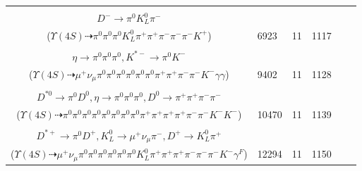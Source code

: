 \documentclass[landscape]{article}
\newcounter{rownumbers}
\newcommand\rn{\stepcounter{rownumbers}\arabic{rownumbers}}
\newcommand{\EOLP}{\\ \hline} %
\newcommand{\topoTags}[1]{#1} %
\begin{document}
\begin{longtable}{clcccc}
\rn & \makecell[l]{ $ 
\Upsilon(4S) \rightarrow B^{0} B^{0} ,
B^{0} \rightarrow K^{+} a_{1}^{-} ,
B^{0} \rightarrow \pi^{0} \pi^{+} D^{*-} ,
a_{1}^{-} \rightarrow \pi^{-} f_{0}(600) ,
D^{*-} \rightarrow \pi^{0} D^{-} ,
f_{0}(600) \rightarrow \pi^{+} \pi^{-} ,
$ \\ $
D^{-} \rightarrow \pi^{0} K_{L}^{0} \pi^{-} 
$ \\ ($
\Upsilon(4S) \dashrightarrow \pi^{0} \pi^{0} \pi^{0} K_{L}^{0} \pi^{+} \pi^{+} \pi^{-} \pi^{-} \pi^{-} K^{+} 
$) } & \topoTags{6923 & }11 & 1117 \EOLP

\rn & \makecell[l]{ $ 
\Upsilon(4S) \rightarrow B^{0} \bar{B}^{0} ,
B^{0} \rightarrow \mu^{+} \nu_{\mu} \eta D^{-} ,
\bar{B}^{0} \rightarrow \pi^{+} K^{*}(1410)^{-} ,
\eta \rightarrow \gamma \gamma ,
D^{-} \rightarrow \pi^{0} \pi^{+} \pi^{-} \pi^{-} \eta ,
K^{*}(1410)^{-} \rightarrow \pi^{0} K^{*-} ,
$ \\ $
\eta \rightarrow \pi^{0} \pi^{0} \pi^{0} ,
K^{*-} \rightarrow \pi^{0} K^{-} 
$ \\ ($
\Upsilon(4S) \dashrightarrow \mu^{+} \nu_{\mu} \pi^{0} \pi^{0} \pi^{0} \pi^{0} \pi^{0} \pi^{0} \pi^{+} \pi^{+} \pi^{-} \pi^{-} K^{-} \gamma \gamma 
$) } & \topoTags{9402 & }11 & 1128 \EOLP

\rn & \makecell[l]{ $ 
\Upsilon(4S) \rightarrow \bar{B}^{0} \bar{B}^{0} ,
\bar{B}^{0} \rightarrow \rho^{+} K^{-} ,
\bar{B}^{0} \rightarrow \pi^{0} \bar{K}^{*} \eta^{\prime} D^{*0} ,
\rho^{+} \rightarrow \pi^{0} \pi^{+} ,
\bar{K}^{*} \rightarrow \pi^{+} K^{-} ,
\eta^{\prime} \rightarrow \pi^{0} \pi^{0} \eta ,
$ \\ $
D^{*0} \rightarrow \pi^{0} D^{0} ,
\eta \rightarrow \pi^{0} \pi^{0} \pi^{0} ,
D^{0} \rightarrow \pi^{+} \pi^{+} \pi^{-} \pi^{-} 
$ \\ ($
\Upsilon(4S) \dashrightarrow \pi^{0} \pi^{0} \pi^{0} \pi^{0} \pi^{0} \pi^{0} \pi^{0} \pi^{0} \pi^{+} \pi^{+} \pi^{+} \pi^{+} \pi^{-} \pi^{-} K^{-} K^{-} 
$) } & \topoTags{10470 & }11 & 1139 \EOLP

\rn & \makecell[l]{ $ 
\Upsilon(4S) \rightarrow B^{0} \bar{B}^{0} ,
B^{0} \rightarrow \pi^{+} D^{-} ,
\bar{B}^{0} \rightarrow \pi^{0} \pi^{+} \pi^{-} \rho^{-} \eta D^{*+} \gamma^{F} ,
D^{-} \rightarrow K_{L}^{0} K^{-} ,
\rho^{-} \rightarrow \pi^{0} \pi^{-} ,
\eta \rightarrow \pi^{0} \pi^{0} \pi^{0} ,
$ \\ $
D^{*+} \rightarrow \pi^{0} D^{+} ,
K_{L}^{0} \rightarrow \mu^{+} \nu_{\mu} \pi^{-} ,
D^{+} \rightarrow K_{L}^{0} \pi^{+} 
$ \\ ($
\Upsilon(4S) \dashrightarrow \mu^{+} \nu_{\mu} \pi^{0} \pi^{0} \pi^{0} \pi^{0} \pi^{0} \pi^{0} K_{L}^{0} \pi^{+} \pi^{+} \pi^{+} \pi^{-} \pi^{-} \pi^{-} K^{-} \gamma^{F} 
$) } & \topoTags{12294 & }11 & 1150 \EOLP


\end{longtable}
\end{document}
